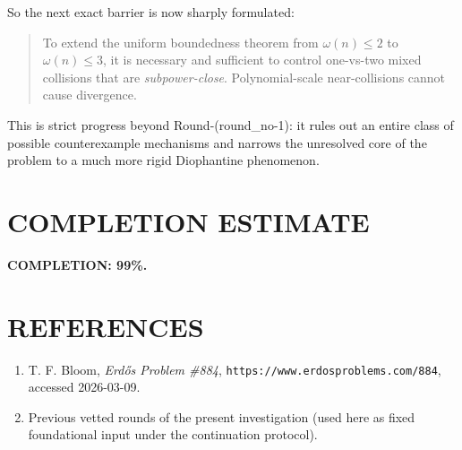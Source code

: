 So the next exact barrier is now sharply formulated:

\begin{quote}
To extend the uniform boundedness theorem from \(\omega(n)\le 2\) to \(\omega(n)\le 3\), it is necessary and sufficient to control one-vs-two mixed collisions that are \emph{subpower-close}. Polynomial-scale near-collisions cannot cause divergence.
\end{quote}

This is strict progress beyond Round-(round\_no-1): it rules out an entire class of possible counterexample mechanisms and narrows the unresolved core of the problem to a much more rigid Diophantine phenomenon.

\section{COMPLETION ESTIMATE}

\noindent \textbf{COMPLETION: 99\%.}

\section{REFERENCES}

\begin{enumerate}
\item T. F. Bloom, \emph{Erd\H{o}s Problem \#884}, \texttt{https://www.erdosproblems.com/884}, accessed 2026-03-09.
\item Previous vetted rounds of the present investigation (used here as fixed foundational input under the continuation protocol).
\end{enumerate}
